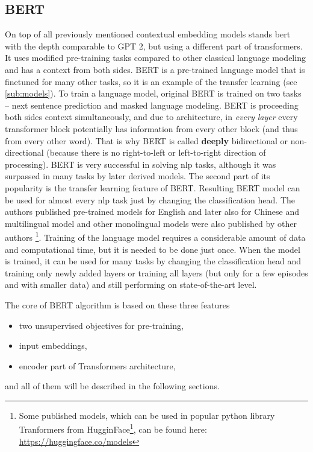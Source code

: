 \subsection{BERT}
On top of all previously mentioned contextual embedding models stands \acrfull{bert} \citep{Devlin2019} with the depth comparable to GPT 2, but using a different part of transformers. It uses modified pre-training tasks compared to other classical language modeling and has a context from both sides. BERT is a pre-trained language model that is finetuned for many other tasks, so it is an example of the transfer learning (see \ref{sub:models}).
To train a language model, original BERT is trained on two tasks -- next sentence prediction and masked language modeling. BERT is proceeding both sides context simultaneously, and due to architecture, in \textit{every layer} every transformer block potentially has information from every other block (and thus from every other word). That is why BERT is called \textbf{deeply} bidirectional or non-directional (because there is no right-to-left or left-to-right direction of processing). BERT is very successful in solving \acrshort{nlp} tasks, although it was surpassed in many tasks by later derived models. 
The second part of its popularity is the transfer learning feature of BERT. Resulting BERT model can be used for almost every \acrshort{nlp} task just by changing the classification head. The authors published pre-trained models for English and later also for Chinese and multilingual model and other monolingual models were also published by other authors \footnote{Some published models, which can be used in popular python library Tranformers from HugginFace\footnote{https://huggingface.co/}, can be found here: \url{https://huggingface.co/models}}. Training of the language model requires a considerable amount of data and computational time, but it is needed to be done just once. When the model is trained, it can be used for many tasks by changing the classification head and training only newly added layers or training all layers (but only for a few episodes and with smaller data) and still performing on state-of-the-art level. 
\par
The core of BERT algorithm is based on these three features
\begin{itemize}
\item two unsupervised objectives for pre-training,
\item input embeddings,
\item encoder part of Transformers architecture,
\end{itemize}
and all of them will be described in the following sections.
